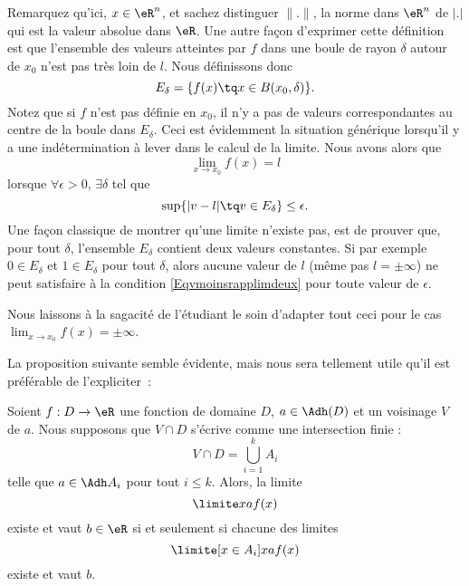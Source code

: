 Remarquez qu'ici, \( x\in\eR^n\), et sachez distinguer \( \| . \|\), la norme dans \( \eR^n\) de \( | . |\) qui est la valeur absolue dans \( \eR\). Une autre façon d'exprimer cette définition est que l'ensemble des valeurs atteintes par \( f\) dans une boule de rayon \( \delta\) autour de \( x_0\) n'est pas très loin de \( l\). Nous définissons donc
\begin{equation}
	E_{\delta}=\{ f(x)\tq x\in B(x_0,\delta) \}.
\end{equation}
Notez que si \( f\) n'est pas définie en \( x_0\), il n'y a pas de valeurs correspondantes au centre de la boule dans \( E_{\delta}\). Ceci est évidemment la situation générique lorsqu'il y a une indétermination à lever dans le calcul de la limite. Nous avons alors que
\begin{equation}
	\lim_{x\to x_0}f(x)=l
\end{equation}
lorsque \( \forall\epsilon>0\), \( \exists\delta\) tel que
\begin{equation}        \label{Eqvmoinsrapplimdeux}
	\sup\{ | v-l |\tq v\in E_{\delta} \}\leq\epsilon.
\end{equation}
Une façon classique de montrer qu'une limite n'existe pas, est de prouver que, pour tout \( \delta\), l'ensemble \( E_{\delta}\) contient deux valeurs constantes. Si par exemple \( 0\in E_{\delta}\) et \( 1\in E_{\delta}\) pour tout \( \delta\), alors aucune valeur de \( l\) (même pas \( l=\pm\infty\)) ne peut satisfaire à la condition \eqref{Eqvmoinsrapplimdeux} pour toute valeur de \( \epsilon\).

Nous laissons à la sagacité de l'étudiant le soin d'adapter tout ceci pour le cas \( \lim_{x\to x_0}f(x)=\pm\infty\).

La proposition suivante semble évidente, mais nous sera tellement
utile qu'il est préférable de l'expliciter~:
\begin{proposition}     \label{PROPooPOAQooPmxEtb}
	Soient \( f : D \to \eR\) une fonction de domaine \( D\), \( a\in\Adh(D)\) et un voisinage \( V\) de \( a\). Nous supposons que \( V\cap D\) s'écrive comme une intersection finie :
	\begin{equation*}
		V\cap D = \bigcup_{i=1}^k A_i
	\end{equation*}
	telle que \( a \in \Adh A_i\) pour tout \( i \leq k\). Alors, la limite
	\begin{equation}      \label{EQooEXELooHccCGw}
		\limite x a f(x)
	\end{equation}
	existe et vaut \( b\in \eR\) si et seulement si chacune des limites
	\begin{equation}
		\limite[x \in A_i] x a f(x)
	\end{equation}
	existe et vaut \( b\).
\end{proposition}

